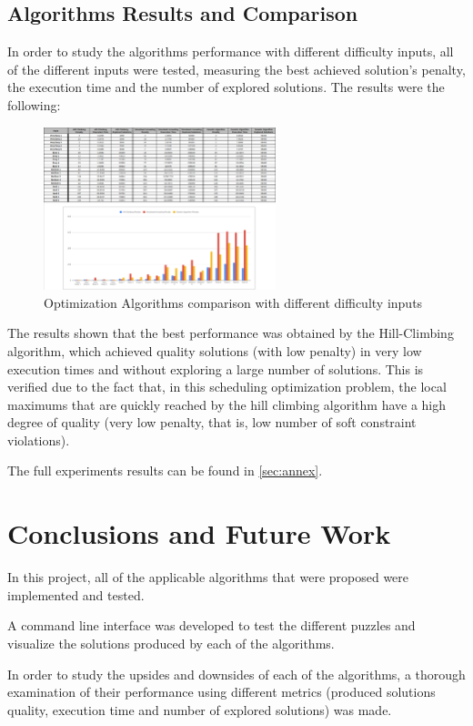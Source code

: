 \documentclass[conference]{IEEEtran}
\begin{document}
\subsection{Algorithms Results and Comparison}

In order to study the algorithms performance with different difficulty inputs, all of the different inputs were tested, measuring the best achieved solution's penalty, the execution time and the number of explored solutions. The results were the following:  

\begin{figure}[H]
    \centerline{\includegraphics[width=255px]{comparison.png}}
    \caption{Optimization Algorithms comparison with different difficulty inputs}
\end{figure}

The results shown that the best performance was obtained by the Hill-Climbing algorithm, which achieved quality solutions (with low penalty) in very low execution times and without exploring a large number of solutions. This is verified due to the fact that, in this scheduling optimization problem, the local maximums that are quickly reached by the hill climbing algorithm have a high degree of quality (very low penalty, that is, low number of soft constraint violations). 

The full experiments results can be found in \autoref{sec:annex}.

\section{Conclusions and Future Work}

In this project, all of the applicable algorithms that were proposed were implemented and tested.

A command line interface was developed to test the different puzzles and visualize the solutions produced by each of the algorithms.

In order to study the upsides and downsides of each of the algorithms, a thorough examination of their performance using different metrics (produced solutions quality, execution time and number of explored solutions) was made. 
\end{document}

